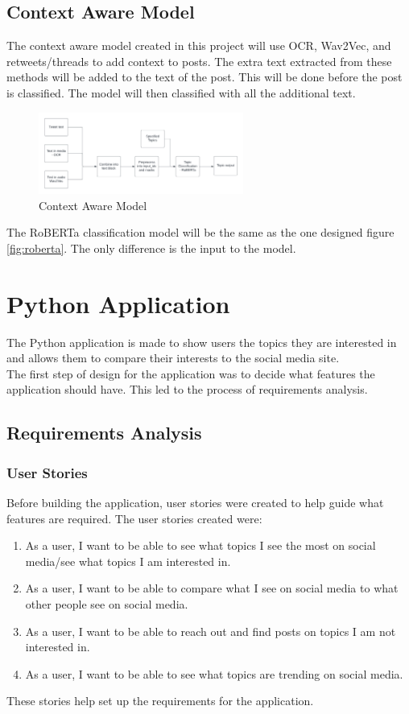 \subsection{Context Aware Model}
The context aware model created in this project will use OCR, Wav2Vec, and retweets/threads to add context to posts. The extra text
extracted from these methods will be added to the text of the post. This will be done before the post is classified. The model will then
classified with all the additional text.
\begin{figure}
    \centering
    \includegraphics[width=0.6\textwidth]{../images/context-aware-model.png}
    \caption{Context Aware Model}
    \label{fig:context-aware-model}
\end{figure}

The RoBERTa classification model will be the same as the one designed figure \ref{fig:roberta}. The only difference is the input
to the model.
\section{Python Application}
The Python application is made to show users the topics they are interested in and allows them to compare their interests to the 
social media site.\\
The first step of design for the application was to decide what features the application should have. This led to the process of
requirements analysis.\\
\subsection{Requirements Analysis}
\subsubsection{User Stories}
Before building the application, user stories were created to help guide what features are required. The user stories created were:
\begin{enumerate}
    \item As a user, I want to be able to see what topics I see the most on social media/see what topics I am interested in.
    \item As a user, I want to be able to compare what I see on social media to what other people see on social media.
    \item As a user, I want to be able to reach out and find posts on topics I am not interested in.
    \item As a user, I want to be able to see what topics are trending on social media.
\end{enumerate}
These stories help set up the requirements for the application.
